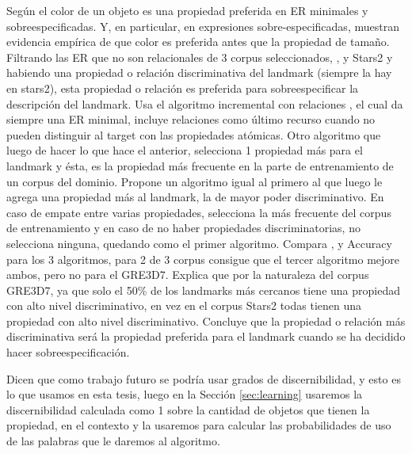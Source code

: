 Seg\'un \cite{pechmann} el color de un objeto es una propiedad preferida en ER minimales y sobreespecificadas. Y, en particular, en expresiones sobre-especificadas, \cite{time-course} muestran evidencia emp\'irica de que color es preferida antes que la propiedad de tama\~no.
Filtrando las ER que no son relacionales de 3 corpus seleccionados, \cite{gre3d3}, \cite{gre3d7} y Stars2 y habiendo una propiedad o relaci\'on discriminativa del landmark (siempre la hay en stars2), esta propiedad o relaci\'on es preferida para sobreespecificar la descripci\'on del landmark.
Usa el algoritmo incremental con relaciones \cite{incremental}, el cual da siempre una ER minimal, incluye relaciones como \'ultimo recurso cuando no pueden distinguir al target con las propiedades at\'omicas. Otro algoritmo que luego de hacer lo que hace el anterior, selecciona 1 propiedad m\'as para el landmark y \'esta, es la propiedad m\'as frecuente en la parte de entrenamiento de un corpus del dominio. Propone un algoritmo igual al primero al que luego le agrega una propiedad m\'as al landmark, la de mayor poder discriminativo. En caso de empate entre varias propiedades, selecciona la m\'as frecuente del corpus de entrenamiento y en caso de no haber propiedades discriminatorias, no selecciona ninguna, quedando como el primer algoritmo. Compara \cite{dice}, y Accuracy para los 3 algoritmos, para 2 de 3 corpus consigue que el tercer algoritmo mejore ambos, pero no para el GRE3D7. 
Explica que por la naturaleza del corpus GRE3D7, ya que solo el 50\% de los landmarks m\'as cercanos tiene una propiedad con alto nivel discriminativo, en vez en el corpus Stars2 todas tienen una propiedad con alto nivel discriminativo. Concluye que la propiedad o relaci\'on m\'as discriminativa ser\'a la propiedad preferida para el landmark cuando se ha decidido hacer sobreespecificaci\'on.

Dicen que como trabajo futuro se podr\'ia usar grados de discernibilidad, y esto es lo que usamos en esta tesis, luego en la Secci\'on \ref{sec:learning} usaremos la discernibilidad calculada como 1 sobre la cantidad de objetos que tienen la propiedad, en el contexto y la usaremos para calcular las probabilidades de uso de las palabras que le daremos al algoritmo.

%



